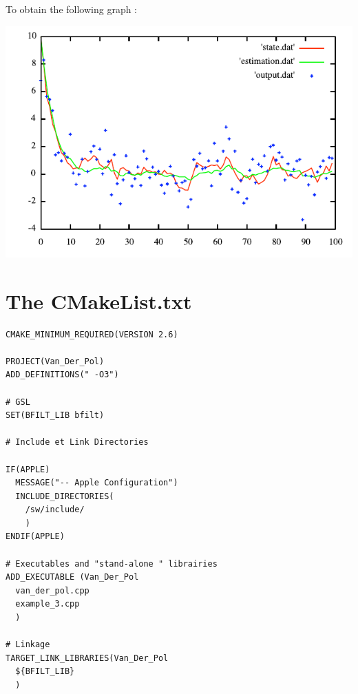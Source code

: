  To obtain the following graph :  \begin{ImageNoCaption}\mbox{\includegraphics{ar_process}}
\end{ImageNoCaption}
\hypertarget{page2_sec3}{}\section{The CMakeList.txt}\label{page2_sec3}


\begin{DocInclude}\begin{verbatim}CMAKE_MINIMUM_REQUIRED(VERSION 2.6)

PROJECT(Van_Der_Pol)
ADD_DEFINITIONS(" -O3")

# GSL
SET(BFILT_LIB bfilt)

# Include et Link Directories

IF(APPLE)
  MESSAGE("-- Apple Configuration")
  INCLUDE_DIRECTORIES(
    /sw/include/
    )
ENDIF(APPLE)

# Executables and "stand-alone " librairies
ADD_EXECUTABLE (Van_Der_Pol
  van_der_pol.cpp
  example_3.cpp
  )

# Linkage
TARGET_LINK_LIBRARIES(Van_Der_Pol
  ${BFILT_LIB}     
  )
\end{verbatim}
\end{DocInclude}
 